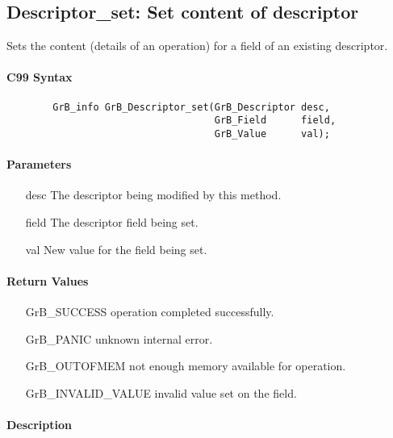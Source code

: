 \subsection{{\sf Descriptor\_set}: Set content of descriptor}

Sets the content (details of an operation) for a field of an existing
descriptor.

\paragraph{C99 Syntax}

\begin{verbatim}
        GrB_info GrB_Descriptor_set(GrB_Descriptor desc,
                                    GrB_Field      field,
                                    GrB_Value      val);
\end{verbatim}

\paragraph{Parameters}

\begin{itemize}[leftmargin=1.1in]
    \item[{\sf desc}]  The descriptor being modified by this method.
    \item[{\sf field}] The descriptor field being set.
    \item[{\sf val}]   New value for the field being set.
\end{itemize}

\paragraph{Return Values}

\begin{itemize}[leftmargin=2.1in]
\item[{\sf GrB\_SUCCESS}]           operation completed successfully.
\item[{\sf GrB\_PANIC}]             unknown internal error.
\item[{\sf GrB\_OUTOFMEM}]          not enough memory available for operation.
\item[{\sf GrB\_INVALID\_VALUE}]    invalid value set on the field.
\end{itemize}

\paragraph{Description}

